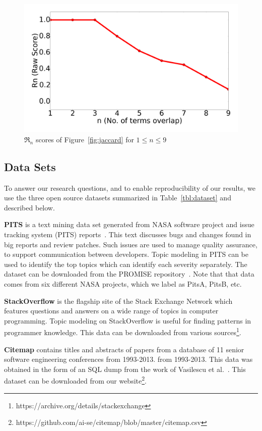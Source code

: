 \documentclass[10pt,conference]{IEEEtran}
\theoremstyle{break}
\begin{document}
\begin{figure}[!htbp]
  \includegraphics[width=\linewidth]{./fig/alln.png}
  \caption{$\Re_n$ scores of 
  Figure~\ref{fig:jaccard} for $1 \le n \le 9$}
  \label{fig:alln}
\end{figure}

\subsection{Data Sets}
To answer our research questions, and to enable reproducibility of our results,
we use the three open source datasets summarized in Table~\ref{tbl:dataset} and described
below.

\textbf{PITS} is a text mining data set generated from NASA software project
and issue tracking system (PITS) reports~\cite{menzies2008improving,
  menzies2008automated}. This text discusses
bugs and changes found in big reports and  review patches.
Such issues are used
to manage quality assurance, to support communication
between developers. Topic modeling in PITS can be used
to identify the top topics which can
identify each severity separately. The dataset can be downloaded from the
PROMISE
repository~\cite{promiserepo}. Note that that data comes from six different
NASA projects, which we label as PitsA, PitsB, etc.
    
 \textbf{StackOverflow} is the flagship site of the Stack Exchange Network which
 features questions and answers on a wide range of topics in computer
 programming.
Topic modeling on StackOverflow is useful for finding patterns in programmer knowledge.
 This data can be downloaded from various
 sources\footnote{https://archive.org/details/stackexchange}. 
    
  \textbf{Citemap} contains titles and abstracts of papers from a
 database of 11 senior software engineering conferences from 1993-2013. from 1993-2013. This data was
 obtained in the form of an SQL dump from the work of Vasilescu et
 al.~\cite{vasilescu2013historical}.  This dataset can be downloaded
 from our website\footnote{https://github.com/ai-se/citemap/blob/master/citemap.csv}.
\end{document}
